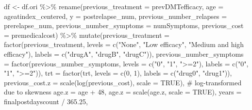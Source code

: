 \documentclass[
  letterpaper,
  DIV=11,
  numbers=noendperiod]{scrreprt}
\newenvironment{Shaded}{\begin{snugshade}}{\end{snugshade}}
\newcommand{\AttributeTok}[1]{\textcolor[rgb]{0.40,0.45,0.13}{#1}}
\newcommand{\CommentTok}[1]{\textcolor[rgb]{0.37,0.37,0.37}{#1}}
\newcommand{\ConstantTok}[1]{\textcolor[rgb]{0.56,0.35,0.01}{#1}}
\newcommand{\DecValTok}[1]{\textcolor[rgb]{0.68,0.00,0.00}{#1}}
\newcommand{\FloatTok}[1]{\textcolor[rgb]{0.68,0.00,0.00}{#1}}
\newcommand{\FunctionTok}[1]{\textcolor[rgb]{0.28,0.35,0.67}{#1}}
\newcommand{\NormalTok}[1]{\textcolor[rgb]{0.00,0.23,0.31}{#1}}
\newcommand{\OtherTok}[1]{\textcolor[rgb]{0.00,0.23,0.31}{#1}}
\newcommand{\SpecialCharTok}[1]{\textcolor[rgb]{0.37,0.37,0.37}{#1}}
\newcommand{\StringTok}[1]{\textcolor[rgb]{0.13,0.47,0.30}{#1}}
\begin{document}
\begin{Shaded}
\begin{Highlighting}[]
\NormalTok{df }\OtherTok{\textless{}{-}}\NormalTok{ df.ori }\SpecialCharTok{\%\textgreater{}\%}
  \FunctionTok{rename}\NormalTok{(}\AttributeTok{previous\_treatment =}\NormalTok{ prevDMTefficacy,}
         \AttributeTok{age =}\NormalTok{ ageatindex\_centered,}
         \AttributeTok{y =}\NormalTok{ postrelapse\_num,}
         \AttributeTok{previous\_number\_relapses =}\NormalTok{ prerelapse\_num,}
         \AttributeTok{previous\_number\_symptoms =}\NormalTok{ numSymptoms,}
         \AttributeTok{previous\_cost =}\NormalTok{ premedicalcost) }\SpecialCharTok{\%\textgreater{}\%}
  \FunctionTok{mutate}\NormalTok{(}\AttributeTok{previous\_treatment =} \FunctionTok{factor}\NormalTok{(previous\_treatment, }
                                     \AttributeTok{levels =} \FunctionTok{c}\NormalTok{(}\StringTok{"None"}\NormalTok{, }\StringTok{"Low efficacy"}\NormalTok{, }\StringTok{"Medium and high efficacy"}\NormalTok{), }
                                     \AttributeTok{labels =} \FunctionTok{c}\NormalTok{(}\StringTok{"drugA"}\NormalTok{, }\StringTok{"drugB"}\NormalTok{, }\StringTok{"drugC"}\NormalTok{)),}
         \AttributeTok{previous\_number\_symptoms =} \FunctionTok{factor}\NormalTok{(previous\_number\_symptoms, }
                                           \AttributeTok{levels =} \FunctionTok{c}\NormalTok{(}\StringTok{"0"}\NormalTok{, }\StringTok{"1"}\NormalTok{, }\StringTok{"\textgreater{}=2"}\NormalTok{), }
                                           \AttributeTok{labels =} \FunctionTok{c}\NormalTok{(}\StringTok{"0"}\NormalTok{, }\StringTok{"1"}\NormalTok{, }\StringTok{"\textgreater{}=2"}\NormalTok{)),}
         \AttributeTok{trt =} \FunctionTok{factor}\NormalTok{(trt, }\AttributeTok{levels =} \FunctionTok{c}\NormalTok{(}\DecValTok{0}\NormalTok{, }\DecValTok{1}\NormalTok{), }\AttributeTok{labels =} \FunctionTok{c}\NormalTok{(}\StringTok{"drug0"}\NormalTok{, }\StringTok{"drug1"}\NormalTok{)),}
         \AttributeTok{previous\_cost.z =} \FunctionTok{scale}\NormalTok{(}\FunctionTok{log}\NormalTok{(previous\_cost), }\AttributeTok{scale =} \ConstantTok{TRUE}\NormalTok{), }\CommentTok{\# log{-}transformed due to skewness}
         \AttributeTok{age.z =}\NormalTok{ age }\SpecialCharTok{+} \DecValTok{48}\NormalTok{,}
         \AttributeTok{age.z =} \FunctionTok{scale}\NormalTok{(age.z, }\AttributeTok{scale =} \ConstantTok{TRUE}\NormalTok{),}
         \AttributeTok{years =}\NormalTok{ finalpostdayscount }\SpecialCharTok{/} \FloatTok{365.25}\NormalTok{,}

\end{Highlighting}
\end{Shaded}
\end{document}

